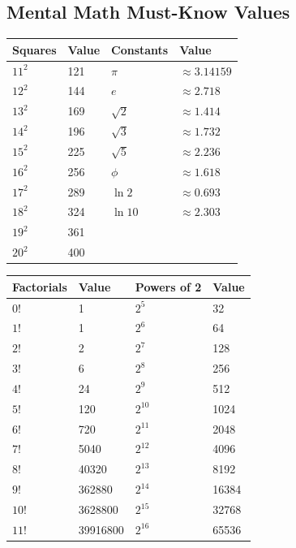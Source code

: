 \documentclass{article}
\begin{document}
\subsection{Mental Math Must-Know Values}

\begin{center}
\begin{tabular}{|l|l||l|l|}
\hline
\textbf{Squares} & \textbf{Value} & \textbf{Constants} & \textbf{Value} \\
\hline
$11^2$ & 121 & $\pi$ & $\approx 3.14159$ \\
$12^2$ & 144 & $e$ & $\approx 2.718$ \\
$13^2$ & 169 & $\sqrt{2}$ & $\approx 1.414$ \\
$14^2$ & 196 & $\sqrt{3}$ & $\approx 1.732$ \\
$15^2$ & 225 & $\sqrt{5}$ & $\approx 2.236$ \\
$16^2$ & 256 & $\phi$ & $\approx 1.618$ \\
$17^2$ & 289 & $\ln 2$ & $\approx 0.693$ \\
$18^2$ & 324 & $\ln 10$ & $\approx 2.303$ \\
$19^2$ & 361 & & \\
$20^2$ & 400 & & \\
\hline
\end{tabular}
\end{center}

\begin{center}
\begin{tabular}{|l|l||l|l|}
\hline
\textbf{Factorials} & \textbf{Value} & \textbf{Powers of 2} & \textbf{Value} \\
\hline
$0!$ & 1 & $2^5$ & 32 \\
$1!$ & 1 & $2^6$ & 64 \\
$2!$ & 2 & $2^7$ & 128 \\
$3!$ & 6 & $2^8$ & 256 \\
$4!$ & 24 & $2^9$ & 512 \\
$5!$ & 120 & $2^{10}$ & 1024 \\
$6!$ & 720 & $2^{11}$ & 2048 \\
$7!$ & 5040 & $2^{12}$ & 4096 \\
$8!$ & 40320 & $2^{13}$ & 8192 \\
$9!$ & 362880 & $2^{14}$ & 16384 \\
$10!$ & 3628800 & $2^{15}$ & 32768 \\
$11!$ & 39916800 & $2^{16}$ & 65536 \\
\hline
\end{tabular}
\end{center}
\end{document}
